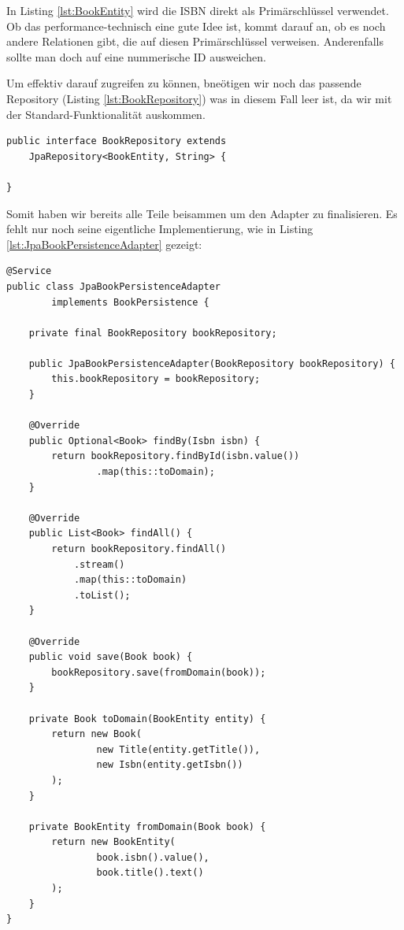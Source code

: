 In Listing \ref{lst:BookEntity} wird die ISBN direkt als Primärschlüssel
verwendet. Ob das performance-technisch eine gute Idee ist, kommt
darauf an, ob es noch andere Relationen gibt, die auf diesen
Primärschlüssel verweisen. Anderenfalls sollte man doch auf eine
nummerische ID ausweichen.

Um effektiv darauf zugreifen zu können, bneötigen wir noch das passende
Repository (Listing \ref{lst:BookRepository}) was in diesem
Fall leer ist, da wir mit der Standard-Funktionalität auskommen.

\begin{listing}[H]
\begin{verbatim}
public interface BookRepository extends 
    JpaRepository<BookEntity, String> {
    
}
\end{verbatim}
\caption{Leeres BookRepository nur mit JPARepository Standardfunktionen}
\label{lst:BookRepository}
\end{listing}

Somit haben wir bereits alle Teile beisammen um den Adapter zu
finalisieren. Es fehlt nur noch seine eigentliche Implementierung,
wie in Listing \ref{lst:JpaBookPersistenceAdapter} gezeigt:

\begin{listing}[H]
\begin{verbatim}
@Service
public class JpaBookPersistenceAdapter
        implements BookPersistence {

    private final BookRepository bookRepository;

    public JpaBookPersistenceAdapter(BookRepository bookRepository) {
        this.bookRepository = bookRepository;
    }

    @Override
    public Optional<Book> findBy(Isbn isbn) {
        return bookRepository.findById(isbn.value())
                .map(this::toDomain);
    }

    @Override
    public List<Book> findAll() {
        return bookRepository.findAll()
            .stream()
            .map(this::toDomain)
            .toList();
    }

    @Override
    public void save(Book book) {
        bookRepository.save(fromDomain(book));
    }

    private Book toDomain(BookEntity entity) {
        return new Book(
                new Title(entity.getTitle()),
                new Isbn(entity.getIsbn())
        );
    }

    private BookEntity fromDomain(Book book) {
        return new BookEntity(
                book.isbn().value(),
                book.title().text()
        );
    }
}
\end{verbatim}
\caption{Der JPA Persistenz-Adapter}
\label{lst:JpaBookPersistenceAdapter}
\end{listing}

